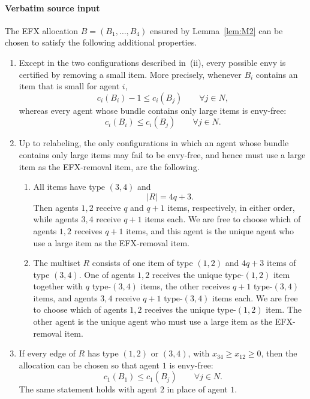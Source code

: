 \documentclass[10pt]{article}
\begin{document}
\paragraph{Verbatim source input}
\begin{ReviewVerbatim}
\begin{lemma}\label{lem:M2properties}
The EFX allocation $B=(B_1,\ldots,B_4)$ ensured by Lemma~\ref{lem:M2} can be chosen to satisfy the
following additional properties.
\begin{enumerate}[label=(\roman*)]
\item Except in the two configurations described in~(ii), every possible envy is certified by removing a small item.  More precisely,
whenever $B_i$ contains an item that is small for agent $i$,
\[
 c_i(B_i)-1\le c_i(B_j)\qquad\forall j\in N,
\]
whereas every agent whose bundle contains only large items is envy-free:
\[
 c_i(B_i)\le c_i(B_j)\qquad\forall j\in N.
\]

\item Up to relabeling, the only configurations in which an agent whose
bundle contains only large items may fail to be envy-free, and hence
must use a large item as the EFX-removal item, are the following.
\begin{enumerate}[label=(\alph*)]
\item All items have type $(3,4)$ and
\[
 |R|=4q+3.
\]
Then agents $1,2$ receive $q$ and $q+1$ items, respectively, in either
order, while agents $3,4$ receive $q+1$ items each.  We are free to choose
which of agents $1,2$ receives $q+1$ items, and this agent is the unique agent who use a large item as the EFX-removal item.

\item The multiset $R$ consists of one item of type $(1,2)$ and
$4q+3$ items of type $(3,4)$.  One of agents $1,2$ receives the unique
type-$(1,2)$ item together with $q$ type-$(3,4)$ items, the other receives
$q+1$ type-$(3,4)$ items, and agents $3,4$ receive $q+1$ type-$(3,4)$
items each.  We are free to choose which of agents $1,2$ receives the unique
type-$(1,2)$ item.  The other agent is the unique agent who must use a large
item as the EFX-removal item.
\end{enumerate}

\item If every edge of $R$ has type $(1,2)$ or $(3,4)$, with
$x_{34}\ge x_{12}\ge 0$, then the allocation can be chosen so that agent $1$
is envy-free:
\[
 c_1(B_1)\le c_1(B_j)\qquad\forall j\in N.
\]
The same statement holds with agent $2$ in place of agent $1$.
\end{enumerate}
\end{lemma}


\end{ReviewVerbatim}
\end{document}
